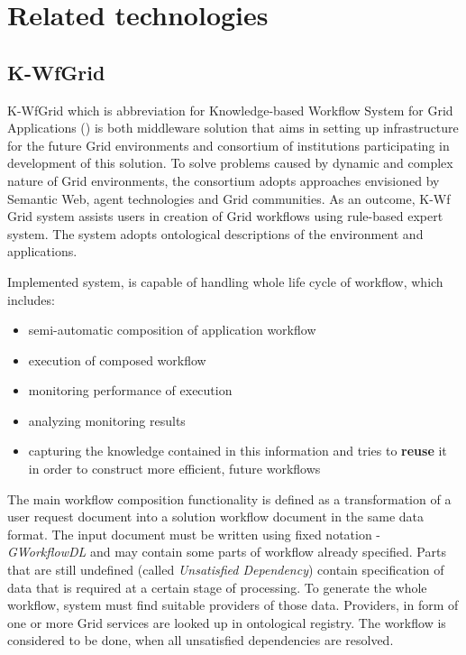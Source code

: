 %
\section{Related technologies}

\subsection{K-WfGrid}
\label{ssec:kwfgrid}
K-WfGrid which is abbreviation for Knowledge-based Workflow System for Grid Applications (\cite{KWfGrid1, flow-cgw04, wct-kwf-book-07}) is both middleware solution that aims in setting up infrastructure for the future Grid environments and consortium of institutions participating in development of this solution. To solve problems caused by dynamic and complex nature of Grid environments, the consortium adopts approaches envisioned by Semantic Web, agent technologies and Grid communities. As an outcome, K-Wf Grid system assists users in creation of Grid workflows using rule-based expert system. The system adopts ontological descriptions of the environment and applications. 

Implemented system, is capable of handling whole life cycle of workflow, which includes: 

\begin{itemize}
	\item{semi-automatic composition of application workflow}
	\item{execution of composed workflow}
	\item{monitoring performance of execution}
	\item{analyzing monitoring results}
	\item{capturing the knowledge contained in this information and tries to {\bf reuse} it in order to construct more efficient, future workflows}
\end{itemize}

The main workflow composition functionality is defined as a transformation of a user request document into a solution workflow document in the same data format. The input document must be written using fixed notation - \emph{GWorkflowDL} and may contain some parts of workflow already specified. Parts that are still undefined (called \emph{Unsatisfied Dependency}) contain specification of data that is required at a certain stage of processing. To generate the whole workflow, system must find suitable providers of those data. Providers, in form of one or more Grid services are looked up in ontological registry. The workflow is considered to be done, when all unsatisfied dependencies are resolved.

